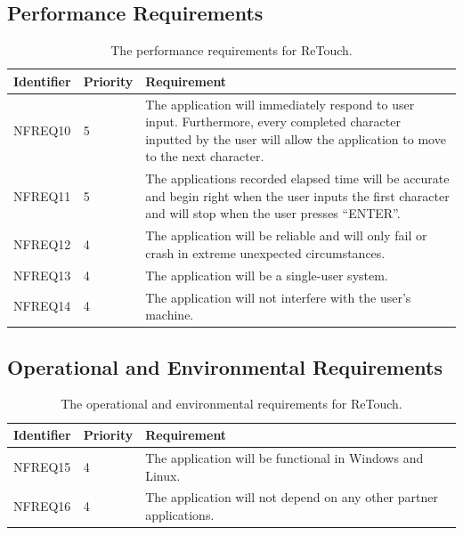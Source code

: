 \documentclass[12pt, titlepage]{article}
\begin{document}
\subsection{Performance Requirements}

\begin{table}[H]
  \caption{The performance requirements for ReTouch.}
\begin{tabular}{ |m{2cm}|m{1.8cm}|m{9.4cm}| }
    \hline
    \textbf{Identifier} & \textbf{Priority} & \textbf{Requirement} \\ 
    \hline
    NFREQ10 & 5 & The application will immediately respond to user input. Furthermore, every completed character inputted by the user will allow the application to move to the next character. \\
    \hline
    NFREQ11 & 5 & The applications recorded elapsed time will be accurate and begin right when the user inputs the first character and will stop when the user presses “ENTER”. \\ 
    \hline
    NFREQ12 & 4 & The application will be reliable and will only fail or crash in extreme unexpected circumstances. \\
    \hline
    NFREQ13 & 4 & The application will be a single-user system. \\
    \hline
    NFREQ14 & 4 & The application will not interfere with the user's machine. \\
    \hline
\end{tabular}
\end{table}

\subsection{Operational and Environmental Requirements}

\begin{table}[H]
  \caption{The operational and environmental requirements for ReTouch.}
\begin{tabular}{ |m{2cm}|m{1.8cm}|m{9.4cm}| }
    \hline
    \textbf{Identifier} & \textbf{Priority} & \textbf{Requirement} \\ 
    \hline
    NFREQ15 & 4 & The application will be functional in Windows and Linux. \\
    \hline
    NFREQ16 & 4 & The application will not depend on any other partner applications. \\
    \hline
\end{tabular}
\end{table}
\end{document}
